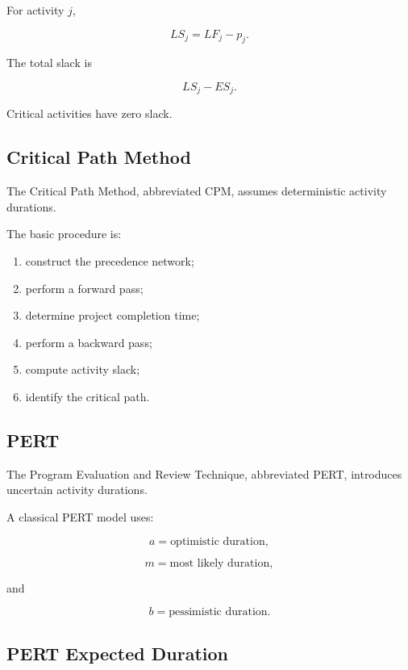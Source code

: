 For activity \(j\),

\[
\boxed{
LS_j
=
LF_j-p_j.
}
\]

The total slack is

\[
\boxed{
LS_j-ES_j.
}
\]

Critical activities have zero slack.

\subsection{Critical Path Method}
\label{subsec:critical-path-method}

The Critical Path Method, abbreviated CPM, assumes deterministic activity
durations.

The basic procedure is:

\begin{enumerate}
    \item construct the precedence network;
    \item perform a forward pass;
    \item determine project completion time;
    \item perform a backward pass;
    \item compute activity slack;
    \item identify the critical path.
\end{enumerate}

\subsection{PERT}
\label{subsec:pert}

The Program Evaluation and Review Technique, abbreviated PERT, introduces
uncertain activity durations.

A classical PERT model uses:

\[
a
=
\text{optimistic duration},
\]

\[
m
=
\text{most likely duration},
\]

and

\[
b
=
\text{pessimistic duration}.
\]

\subsection{PERT Expected Duration}
\label{subsec:pert-expected-duration}

